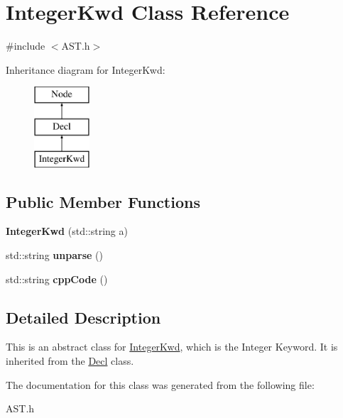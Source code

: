 \hypertarget{class_integer_kwd}{}\section{Integer\+Kwd Class Reference}
\label{class_integer_kwd}


{\ttfamily \#include $<$A\+S\+T.\+h$>$}

Inheritance diagram for Integer\+Kwd\+:\begin{figure}[H]
\begin{center}
\leavevmode
\includegraphics[height=3.000000cm]{class_integer_kwd}
\end{center}
\end{figure}
\subsection*{Public Member Functions}
\begin{DoxyCompactItemize}
\item 
\hypertarget{class_integer_kwd_abd2d93c0c7f12df24d5457e3644e3b31}{}{\bfseries Integer\+Kwd} (std\+::string a)\label{class_integer_kwd_abd2d93c0c7f12df24d5457e3644e3b31}

\item 
\hypertarget{class_integer_kwd_aca550f93e83289d82051ab7e17d01396}{}std\+::string {\bfseries unparse} ()\label{class_integer_kwd_aca550f93e83289d82051ab7e17d01396}

\item 
\hypertarget{class_integer_kwd_a1e26b44c2151fc56e136eb8329b81ff5}{}std\+::string {\bfseries cpp\+Code} ()\label{class_integer_kwd_a1e26b44c2151fc56e136eb8329b81ff5}

\end{DoxyCompactItemize}


\subsection{Detailed Description}
This is an abstract class for \hyperlink{class_integer_kwd}{Integer\+Kwd}, which is the Integer Keyword. It is inherited from the \hyperlink{class_decl}{Decl} class. 

The documentation for this class was generated from the following file\+:\begin{DoxyCompactItemize}
\item 
A\+S\+T.\+h\end{DoxyCompactItemize}
